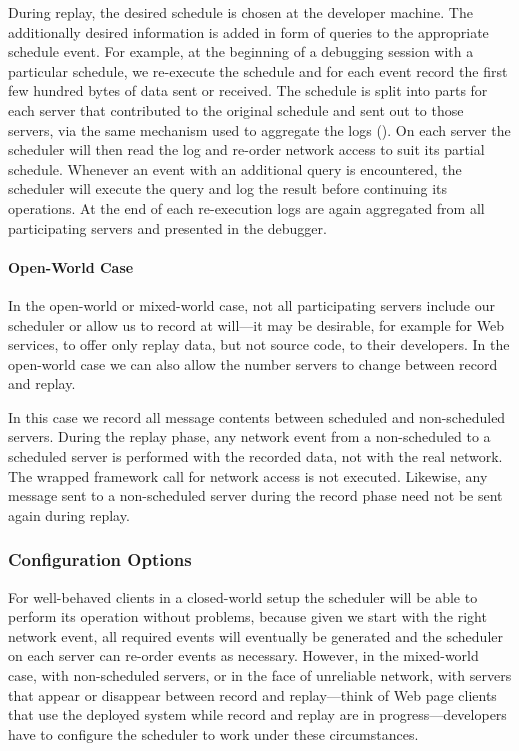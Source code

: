 During replay, the desired schedule is chosen at the developer
machine. The additionally desired information is added in form of
queries to the appropriate schedule event. For example, at the
beginning of a debugging session with a particular schedule, we
re-execute the schedule and for each event record the first few
hundred bytes of data sent or received. The schedule is split into
parts for each server that contributed to the original schedule and
sent out to those servers, via the same mechanism used to aggregate
the logs (). On each server the
scheduler will then read the log and re-order network access to suit
its partial schedule. Whenever an event with an additional query is
encountered, the scheduler will execute the query and log the result
before continuing its operations. At the end of each re-execution logs
are again aggregated from all participating servers and presented in
the debugger.

\paragraph{Open-World Case}
\label{sec:open-world-case}

In the open-world or mixed-world case, not all participating servers
include our scheduler or allow us to record at will---it may be
desirable, for example for Web services, to offer only replay data,
but not source code, to their developers. In the open-world case we
can also allow the number servers to change between record and replay.

In this case we record all message contents between scheduled and
non-scheduled servers. During the replay phase, any network event from
a non-scheduled to a scheduled server is performed with the recorded
data, not with the real network. The wrapped framework call for
network access is not executed. Likewise, any message sent to a
non-scheduled server during the record phase need not be sent again
during replay.

\subsubsection{Configuration Options}
\label{sec:required-heuristics}

For well-behaved clients in a closed-world setup the scheduler will be
able to perform its operation without problems, because given we start
with the right network event, all required events will eventually be
generated and the scheduler on each server can re-order events as
necessary. However, in the mixed-world case, with non-scheduled
servers, or in the face of unreliable network, with servers that
appear or disappear between record and replay---think of Web page
clients that use the deployed system while record and replay are in
progress---developers have to configure the scheduler to work under
these circumstances.

